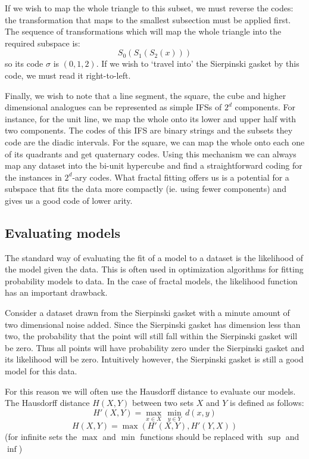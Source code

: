 \documentclass[10pt,a4paper,oneside]{article}
\theoremstyle{definition}
\begin{document}
If we wish to map the whole triangle to this subset, we must reverse the codes: the transformation that maps to the smallest subsection must be applied first. The sequence of transformations which will map the whole triangle into the required subspace is:
\[
S_0(S_1(S_2(x)))
\]
so its code $\sigma$ is $(0, 1, 2)$. If we wish to `travel into' the Sierpinski gasket by this code, we must read it right-to-left.

Finally, we wish to note that a line segment, the square, the cube and higher dimensional analogues can be represented as simple IFSs of $2^d$ components. For instance, for the unit line, we map the whole onto its lower and upper half with two components. The codes of this IFS are binary strings and the subsets they code are the diadic intervals. For the square, we can map the whole onto each one of its quadrants and get quaternary codes. Using this mechanism we can always map any dataset into the bi-unit hypercube and find a straightforward coding for the instances in $2^d$-ary codes. What fractal fitting offers us is a potential for a subspace that fits the data more compactly (ie. using fewer components) and gives us a good code of lower arity.

\subsection*{Evaluating models}

The standard way of evaluating the fit of a model to a dataset is the likelihood of the model given the data. This is often used in optimization algorithms for fitting probability models to data. In the case of fractal models, the likelihood function has an important drawback. 

Consider a dataset drawn from the Sierpinski gasket with a minute amount of two dimensional noise added. Since the Sierpinski gasket has dimension less than two, the probability that the point will still fall within the Sierpinski gasket will be zero. Thus all points will have probability zero under the Sierpinski gasket and its likelihood will be zero. Intuitively however, the Sierpinski gasket is still a good model for this data.

For this reason we will often use the Hausdorff distance to evaluate our models. The Hausdorff distance  $H(X, Y)$ between two sets $X$ and $Y$ is defined as follows:
\[ 
H'(X, Y) = \max_{x\in X} \, \min_{y\in Y} \, d(x, y) 
\]
\[
H(X, Y) = \max\left (H'(X, Y), H'(Y, X)\right )
\]
 (for infinite sets the $\max$ and $\min$ functions should be replaced with $\sup$ and $\inf$)
 
\end{document}

